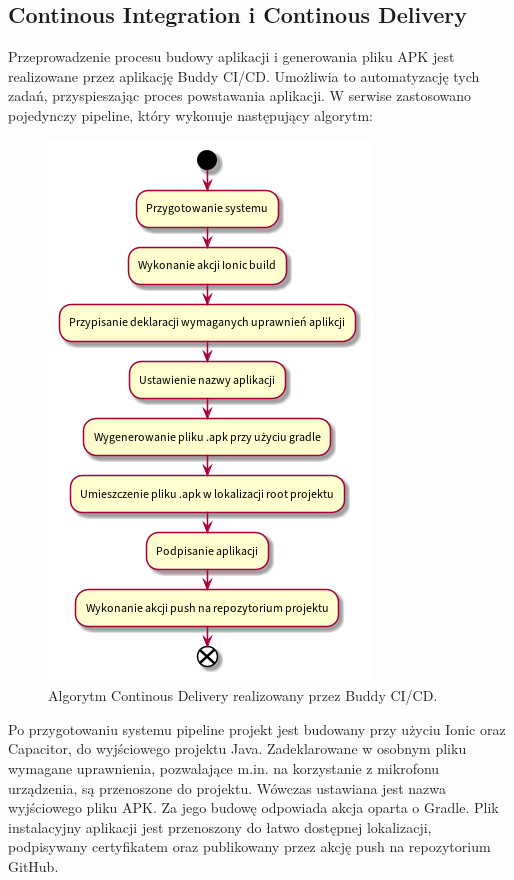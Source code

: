 \subsection{Continous Integration i Continous Delivery}
Przeprowadzenie procesu budowy aplikacji i generowania pliku APK jest realizowane przez aplikację
Buddy CI/CD. Umożliwia to automatyzację tych zadań, przyspieszając proces powstawania aplikacji.
W serwise zastosowano pojedynczy pipeline, który wykonuje następujący algorytm:

\begin{figure}[H]
	\begin{center}
		\includegraphics[scale=0.6]{media/ContinousDelivery.png}
	\end{center}
	\caption{Algorytm Continous Delivery realizowany przez Buddy CI/CD.}
	\label{rys:continous-delivery}
\end{figure}

Po przygotowaniu systemu pipeline projekt jest budowany przy użyciu Ionic oraz Capacitor, do wyjściowego projektu Java.
Zadeklarowane w osobnym pliku wymagane uprawnienia, pozwalające m.in. na korzystanie z mikrofonu urządzenia, są
przenoszone do projektu. Wówczas ustawiana jest nazwa wyjściowego pliku APK.
Za jego budowę odpowiada akcja oparta o Gradle. Plik instalacyjny aplikacji jest przenoszony do łatwo dostępnej
lokalizacji, podpisywany certyfikatem oraz publikowany przez akcję push na repozytorium GitHub.

